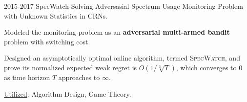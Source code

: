\begin{cventries}
	
	\cvprojectentry
	{2015-2017 SpecWatch} %
	{Solving Adversasial Spectrum Usage Monitoring Problem with Unknown Statistics in CRNs.} %
	{
		\begin{cvitems} %
			\item Modeled the monitoring problem as an \textbf{adversarial multi-armed bandit }problem with switching cost.
			\item
			Designed an asymptotically optimal online algorithm, termed {\textsc{SpecWatch}}, and prove its normalized expected weak regret is $O(1/\sqrt[3]{T})$, which converges to 0 as time horizon $T$ approaches to $\infty$. 
			\item  \underline{Utilized}: Algorithm Design, Game Theory.
		\end{cvitems}
	}
	
	

\end{cventries}
